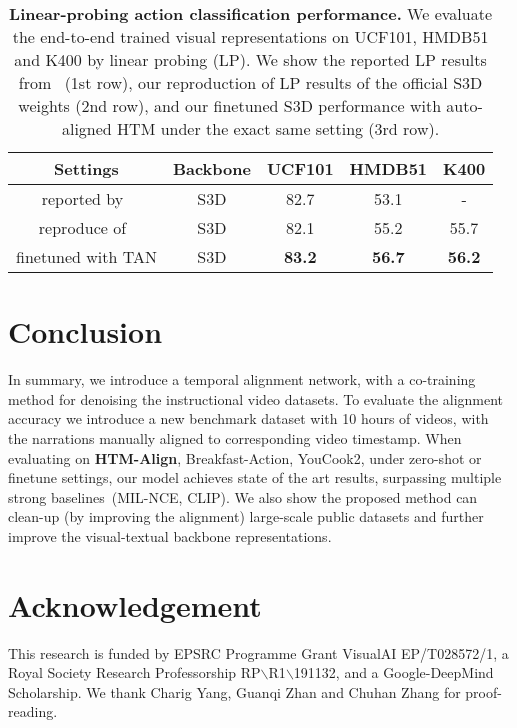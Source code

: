 \begin{table}[htb!]
\footnotesize
\centering
\vspace{-0mm}
\begin{tabu}[t]{c|c|ccc}
    \hline
    Settings & Backbone & UCF101 & HMDB51 & K400 \\\hline
    \rowfont{\color{gray}} 
    reported by~\cite{Miech20}  & S3D  &  82.7 & 53.1 & - \\
    reproduce of~\cite{Miech20}   & S3D  &  82.1 & 55.2 & 55.7 \\
    finetuned with TAN            & S3D  &  \textbf{83.2} & \textbf{56.7} & \textbf{56.2} \\\hline
\end{tabu}
\vspace{-2mm}
\caption{
\footnotesize \textbf{Linear-probing action classification performance.}
We evaluate the end-to-end trained visual representations
on UCF101, HMDB51 and K400 by linear probing (LP).
We show the reported LP results from~\cite{Miech20} (1st row),
our reproduction of LP results of the official S3D weights (2nd row),
and our finetuned S3D performance with auto-aligned HTM 
under the exact same setting (3rd row).
}\label{table:end_to_end}
\vspace{-3mm}
\end{table}
\vspace{-4pt}
\section{Conclusion}
\vspace{-2mm}
In summary, 
we introduce a temporal alignment network, with a co-training method for denoising the instructional video datasets.
To evaluate the alignment accuracy we introduce a new benchmark dataset with 10 hours of videos, 
with the narrations manually aligned to corresponding video timestamp.
When evaluating on \textbf{HTM-Align}, 
Breakfast-Action, YouCook2, 
under zero-shot or finetune settings,
our model achieves state of the art results, 
surpassing multiple strong baselines~(MIL-NCE, CLIP).
We also show the proposed method can clean-up (by improving the alignment) 
large-scale public datasets and further improve the visual-textual backbone representations.

\clearpage
\section*{Acknowledgement}
\vspace{-1mm}
This research is funded by 
EPSRC Programme Grant VisualAI EP/T028572/1, a
Royal Society Research Professorship RP$\backslash$R1$\backslash$191132,  and 
a Google-DeepMind Scholarship.
We thank Charig Yang, Guanqi Zhan and Chuhan Zhang for proof-reading.
\begingroup
{\small
}
\endgroup

\clearpage
{}

